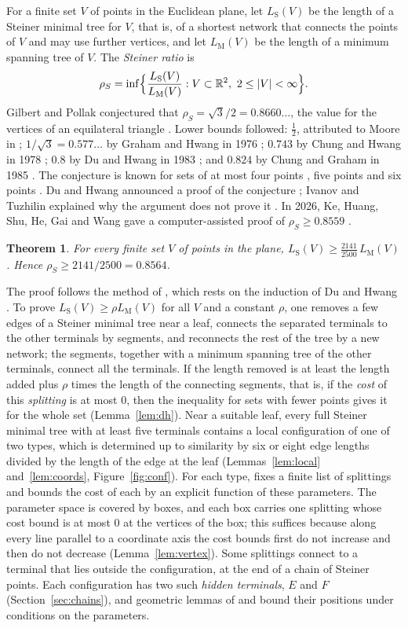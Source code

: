 \documentclass[11pt]{amsart}
\newtheorem{theorem}{Theorem}[section]
\theoremstyle{definition}
\theoremstyle{remark}
\numberwithin{equation}{section}
\newcommand{\LS}{L_{\mathrm S}}
\newcommand{\LM}{L_{\mathrm M}}
\newcommand{\RHO}{\tfrac{2141}{2500}}
\begin{document}
For a finite set $V$ of points in the Euclidean plane, let $\LS(V)$ be the length of a Steiner minimal tree for $V$, that is, of a shortest network that connects the points of $V$ and may use further vertices, and let $\LM(V)$ be the length of a minimum spanning tree of $V$. The \emph{Steiner ratio} is
\[
\rho_S=\inf\Bigl\{\frac{\LS(V)}{\LM(V)}:V\subset\mathbb R^2,\ 2\le|V|<\infty\Bigr\}.
\]
Gilbert and Pollak conjectured that $\rho_S=\sqrt3/2=0.8660\ldots$, the value for the vertices of an equilateral triangle \cite{GP68}. Lower bounds followed: $\frac12$, attributed to Moore in \cite{GP68}; $1/\sqrt3=0.577\ldots$ by Graham and Hwang in 1976 \cite{GH76}; $0.743$ by Chung and Hwang in 1978 \cite{CH78}; $0.8$ by Du and Hwang in 1983 \cite{DH83}; and $0.824$ by Chung and Graham in 1985 \cite{CG85}. The conjecture is known for sets of at most four points \cite{Pol78,DYH82}, five points \cite{DHY85} and six points \cite{RT91}. Du and Hwang announced a proof of the conjecture \cite{DH90,DH92}; Ivanov and Tuzhilin explained why the argument does not prove it \cite{IT12}. In 2026, Ke, Huang, Shu, He, Gai and Wang gave a computer-assisted proof of $\rho_S\ge0.8559$ \cite{KHSHGW}.

\begin{theorem}\label{thm:main}
For every finite set $V$ of points in the plane, $\LS(V)\ge\RHO\,\LM(V)$. Hence $\rho_S\ge2141/2500=0.8564$.
\end{theorem}

The proof follows the method of \cite{KHSHGW}, which rests on the induction of Du and Hwang \cite{DH83}. To prove $\LS(V)\ge\rho\LM(V)$ for all $V$ and a constant $\rho$, one removes a few edges of a Steiner minimal tree near a leaf, connects the separated terminals to the other terminals by segments, and reconnects the rest of the tree by a new network; the segments, together with a minimum spanning tree of the other terminals, connect all the terminals. If the length removed is at least the length added plus $\rho$ times the length of the connecting segments, that is, if the \emph{cost} of this \emph{splitting} is at most $0$, then the inequality for sets with fewer points gives it for the whole set (Lemma~\ref{lem:dh}). Near a suitable leaf, every full Steiner minimal tree with at least five terminals contains a local configuration of one of two types, which is determined up to similarity by six or eight edge lengths divided by the length of the edge at the leaf (Lemmas~\ref{lem:local} and~\ref{lem:coords}, Figure~\ref{fig:conf}). For each type, \cite{KHSHGW} fixes a finite list of splittings and bounds the cost of each by an explicit function of these parameters. The parameter space is covered by boxes, and each box carries one splitting whose cost bound is at most $0$ at the vertices of the box; this suffices because along every line parallel to a coordinate axis the cost bounds first do not increase and then do not decrease (Lemma~\ref{lem:vertex}). Some splittings connect to a terminal that lies outside the configuration, at the end of a chain of Steiner points. Each configuration has two such \emph{hidden terminals}, $E$ and $F$ (Section~\ref{sec:chains}), and geometric lemmas of \cite{KHSHGW} and \cite{DH83} bound their positions under conditions on the parameters.
\end{document}
